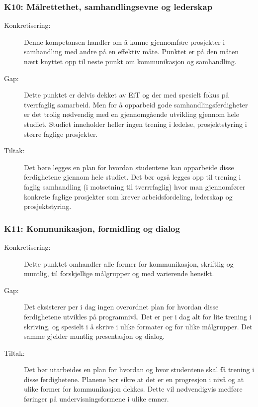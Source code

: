 \subsubsection{K10: Målrettethet, samhandlingsevne og lederskap}
\begin{description}
\item[Konkretisering:] Denne kompetansen handler om å kunne gjennomføre prosjekter i samhandling med andre på en effektiv måte. Punktet er på den måten nært knyttet opp til neste punkt om kommunikasjon og samhandling. 
\item[Gap:]Dette punktet er delvis dekket av EiT og der med spesielt fokus på tverrfaglig samarbeid. Men for å opparbeid gode samhandlingsferdigheter er det trolig nødvendig med en gjennomgående utvikling gjennom hele studiet. Studiet inneholder heller ingen trening i ledelse, prosjektstyring i større faglige prosjekter.
\item[Tiltak:] Det børe legges en plan for hvordan studentene kan opparbeide disse ferdighetene gjennom hele studiet. Det bør også legges opp til trening i faglig samhandling (i  motsetning til tverrrfaglig) hvor man gjennomfører konkrete faglige prosjekter som krever arbeidsfordeling, lederskap og prosjektstyring.
\end{description}

\subsubsection{K11: Kommunikasjon, formidling og dialog}
\begin{description}
\item[Konkretisering:] Dette punktet omhandler alle former for kommunikasjon, skriftlig og muntlig, til forskjellige målgrupper og med varierende hensikt.
\item[Gap:] Det eksisterer per i dag ingen overordnet plan for hvordan disse ferdighetene utvikles på programnivå. Det er per i dag alt for lite trening i skriving, og spesielt i å skrive i ulike formater og for ulike målgrupper. Det samme gjelder muntlig presentasjon og dialog.
\item[Tiltak:] Det bør utarbeides en plan for hvordan og hvor studentene skal få trening i disse ferdighetene. Planene bør sikre at det er en progresjon i nivå og at ulike former for kommunikasjon dekkes. Dette vil nødvendigvis medføre føringer på undervisningsformene i ulike emner.
\end{description}


